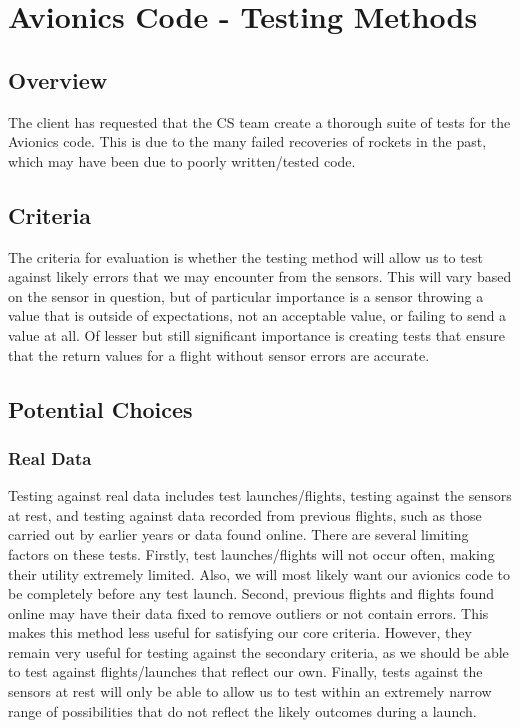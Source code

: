 \documentclass[onecolumn, draftclsnofoot,10pt, compsoc]{IEEEtran}
\begin{document}
\section{Avionics Code - Testing Methods}
\subsection{Overview}
The client has requested that the CS team create a thorough suite of tests for the Avionics code. This is due to the many failed recoveries of rockets in the past, which may have been due to poorly written/tested code.
\subsection{Criteria}
The criteria for evaluation is whether the testing method will allow us to test against likely errors that we may encounter from the sensors. This will vary based on the sensor in question, but of particular importance is a sensor throwing a value that is outside of expectations, not an acceptable value, or failing to send a value at all. Of lesser but still significant importance is creating tests that ensure that the return values for a flight without sensor errors are accurate.
\subsection{Potential Choices}
\subsubsection{Real Data}
Testing against real data includes test launches/flights, testing against the sensors at rest, and testing against data recorded from previous flights, such as those carried out by earlier years or data found online. There are several limiting factors on these tests. Firstly, test launches/flights will not occur often, making their utility extremely limited. Also, we will most likely want our avionics code to be completely before any test launch. Second, previous flights and flights found online may have their data fixed to remove outliers or not contain errors. This makes this method less useful for satisfying our core criteria. However, they remain very useful for testing against the secondary criteria, as we should be able to test against flights/launches that reflect our own. Finally, tests against the sensors at rest will only be able to allow us to test within an extremely narrow range of possibilities that do not reflect the likely outcomes during a launch.
\end{document}

